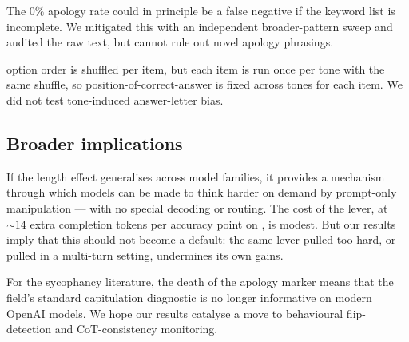  The $0\%$ apology rate could in principle be a false negative if the keyword list is incomplete. We mitigated this with an independent broader-pattern sweep and audited the raw text, but cannot rule out novel apology phrasings.

 \tqa option order is shuffled per item, but each item is run once per tone with the same shuffle, so position-of-correct-answer is fixed across tones for each item. We did not test tone-induced answer-letter bias.

\subsection{Broader implications}

If the length effect generalises across model families, it provides a mechanism through which models can be made to think harder on demand by prompt-only manipulation --- with no special decoding or routing. The cost of the lever, at $\sim 14$ extra completion tokens per accuracy point on \tqa, is modest. But our \flipflop results imply that this should not become a default: the same lever pulled too hard, or pulled in a multi-turn setting, undermines its own gains.

For the sycophancy literature, the death of the apology marker means that the field's standard capitulation diagnostic is no longer informative on modern OpenAI models. We hope our results catalyse a move to behavioural flip-detection and CoT-consistency monitoring.
